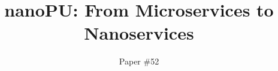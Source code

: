 \documentclass[sigconf,10pt,preprint,balance]{acmart}
\begin{document}
\title{nanoPU: From Microservices to Nanoservices}

\author{Paper \#52}







\if{}
    \setcounter{page}{0}
    \listoftodos {}
    \clearpage
\fi



\maketitle

\if{}
    \pagestyle{plain}
\fi










\label{lastpage}

{\footnotesize 


}

\label{totalpage}
\end{document}
